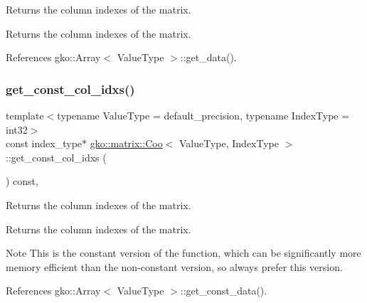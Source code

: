 Returns the column indexes of the matrix. 

\begin{DoxyReturn}{Returns}
the column indexes of the matrix. 
\end{DoxyReturn}


References gko\+::\+Array$<$ Value\+Type $>$\+::get\+\_\+data().

\mbox{\label{classgko_1_1matrix_1_1Coo_ae4afdbf2dc5a5a42a197f3a479febc75}} 
\subsubsection{\texorpdfstring{get\+\_\+const\+\_\+col\+\_\+idxs()}{get\_const\_col\_idxs()}}
{\footnotesize\ttfamily template$<$typename Value\+Type = default\+\_\+precision, typename Index\+Type = int32$>$ \\
const index\+\_\+type$\ast$ \hyperlink{classgko_1_1matrix_1_1Coo}{gko\+::matrix\+::\+Coo}$<$ Value\+Type, Index\+Type $>$\+::get\+\_\+const\+\_\+col\+\_\+idxs (\begin{DoxyParamCaption}{ }\end{DoxyParamCaption}) const\hspace{0.3cm}{\ttfamily [inline]}, {\ttfamily [noexcept]}}



Returns the column indexes of the matrix. 

\begin{DoxyReturn}{Returns}
the column indexes of the matrix.
\end{DoxyReturn}
\begin{DoxyNote}{Note}
This is the constant version of the function, which can be significantly more memory efficient than the non-\/constant version, so always prefer this version. 
\end{DoxyNote}


References gko\+::\+Array$<$ Value\+Type $>$\+::get\+\_\+const\+\_\+data().

\mbox{\label{classgko_1_1matrix_1_1Coo_a0fe0f33bf492bf2f9134927c7ee90e81}} 
